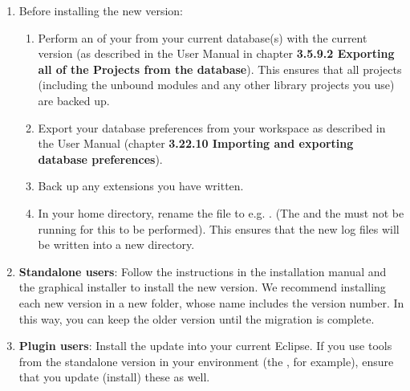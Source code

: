 \begin{enumerate}
\item Before installing the new version:
\begin{enumerate}
\item Perform an  of your \gdprojects{} from your current database(s) with the current version  (as described in the User Manual in chapter \textbf{3.5.9.2 Exporting all of the Projects from the database}). This ensures that all projects (including the unbound modules and any other library projects you use) are backed up.
\item Export your database preferences from your workspace as described in the User Manual (chapter \textbf{3.22.10 Importing and exporting database preferences}).
\item Back up any extensions you have written.
\item In your home directory, rename the  file to e.g. . (The \ite{} and the \gdagent{} must not be running for this to be performed). This ensures that the new log files will be written into a new  directory. 
\end{enumerate}
\item \textbf{Standalone users}: Follow the instructions in the installation manual and the graphical installer to install the new version. We recommend installing each new version in a new folder, whose name includes the version number. In this way, you can keep the older version until the migration is complete. 
\item \textbf{Plugin users}: Install the update into your current Eclipse. If you use tools from the standalone version in your environment (the \gdagent{}, for example), ensure that you update (install) these as well. 
\end{enumerate}
